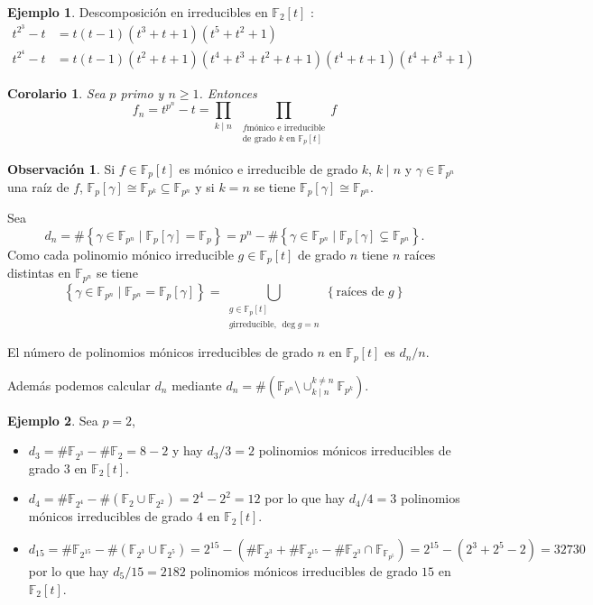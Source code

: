 \documentclass[10pt, spanish]{report}
\newtheorem{cor}{Corolario}[tma]
\theoremstyle{definition}
\newtheorem*{ej}{Ejemplo}
\newtheorem*{obs}{Observación}
\newcommand{\F}{\mathbb{F}}
\renewcommand{\geq}{\geqslant}
\begin{document}
\begin{ej}
    Descomposición en irreducibles en $\F_2[t]$ :
    \begin{align*}
        t^{2^3}-t&=t(t-1)(t^3+t+1)(t^5+t^2+1)\\
        t^{2^4}-t&=t(t-1)(t^2+t+1)(t^4+t^3+t^2+t+1)(t^4+t+1)(t^4+t^3+1)
    \end{align*}
\end{ej}

\begin{cor}
    Sea $p$ primo y $n\geq1$. Entonces \[f_n=t^{p^n}-t=\prod_{k\mid n}\
        \prod_{\substack{f  \text{mónico e irreducible}\\\text{de grado } k
                \text{ en }\F_p[t]}}f\]
\end{cor}

\begin{obs}
    Si $f\in\F_p[t]$ es mónico e irreducible de grado $k$, $k\mid n$ y $\gamma
    \in\F_{p^n}$ una raíz de $f$, $\F_p[\gamma]\cong \F_{p^k}\subseteq\F_{p^n}$
    y si $k=n$ se tiene $\F_p[\gamma]\cong\F_{p^n}$.

    Sea \[d_n=\#\left\{\gamma\in\F_{p^n}\mid\F_p[\gamma]=\F_p\right\}=p^n-
    \#\left\{ \gamma\in\F_{p^n}\mid \F_p[\gamma]\subsetneq \F_{p^n}\right\}.\]
    Como cada polinomio mónico irreducible $g\in\F_p[t]$ de grado $n$ tiene $n$
    raíces distintas en $\F_{p^n}$ se tiene
    \[ \left\{ \gamma\in\F_{p^n} \mid \F_{p^n} = \F_p[\gamma] \right\}
        = \bigcup_{\substack{g\in\F_p[t]\\g\text{
    irreducible},\,\deg{g}=n}}\left\{ \text{raíces de }g \right\}
    \]

    El número de polinomios mónicos irreducibles de grado $n$ en $\F_p[t]$ es $d_n /n$.

    Además podemos calcular $d_n$ mediante $d_n=\#(
    \F_{p^n}\setminus\cup_{k\mid n}^{k\neq n} \F_{p^k})$.
\end{obs}

\begin{ej}
    Sea $p=2$,
    \begin{itemize}
        \item
            $d_3=\#\F_{2^3} -\#\F_2=8-2$ y hay $d_3 /3 = 2$ polinomios mónicos
            irreducibles de grado $3$ en $\F_2[t]$.
        \item
            $d_4=\#\F_{2^4} -\#\left( \F_2\cup \F_{2^2} \right) = 2^4 -2^2 = 12$
            por lo que hay ${d_4}/{4} = 3$ polinomios mónicos irreducibles de grado
            $4$ en $\F_2[t]$.
        \item
            $d_{15}=\# \F_{2^15} - \# \left( \F_{2^3}\cup \F_{2^{5}} \right)
            =2^{15}-(\#\F_{2^3}+\#\F_{2^{15}}-\#\F_{2^3}\cap\F_{\F_{p^5}} )
            =2^{15}-(2^3+2^5-2)=32730$ por lo que hay $d_5 / 15 = 2182$
            polinomios mónicos irreducibles de grado $15$ en $\F_2[t]$.
    \end{itemize}
\end{ej}
\end{document}
